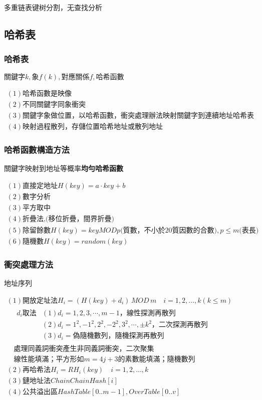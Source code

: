 \documentclass[UTF8]{ctexart}
\newcommand{\mt}[1]{\text{#1}}
\newcommand{\mb}[1]{\textbf{#1}}
\newcommand{\q}{\quad}
\newcommand{\ma}[1]{\begin{array}{llll} #1 \end{array}}
\begin{document}
多重链表键树分割，无查找分析

\subsection{哈希表}

\subsubsection{哈希表}


$\mt{關鍵字}k,\mt{象} f(k),\mt{對應關係}f,\mb{哈希函數}$

$\ma{
    (1) \mt{哈希函數是映像}\\
    (2) \mt{不同關鍵字同象}\mb{衝突}\\
    (3) \mt{關鍵字象做位置，以哈希函數，衝突處理辦法映射關鍵字到連續地址} \mb{哈希表}\\
    (4) \mt{映射過程}\mb{散列}，\mt{存儲位置}\mb{哈希地址或散列地址}
}$
 

\subsubsection{哈希函數構造方法}

關鍵字映射到地址等概率\mb{均勻哈希函數}

$\ma{
    (1) \mt{直接定地址} H(key)=a \cdot key +b\\
    (2) \mt{數字分析}\\
    (3) \mt{平方取中}\\
    (4) \mt{折疊法,(移位折疊，間界折疊)}\\
    (5) \mt{除留餘數}  H(key)=key MOD p\mt{(質數，不小於20質因數的合數)}, p \leqslant m\mt{(表長)}\\
    (6) \mt{隨機數}   H(key)=random(key)  
}$

\subsubsection{衝突處理方法}

地址序列

$\ma{
    (1) \mt{開放定址法} H_i=(H(key)+d_i) \, MOD\,  m \q i=1,2,\dots,k (k\leqslant m)\\
    \q \ma{
        d_i \mt{取法} &(1) d_i=1,2,3,\cdots,m-1  \mt{，線性探測再散列}\\
        &(2) d_i=1^2,-1^2,2^2,-2^2,3^2,\cdots,\pm k^2  \mt{，二次探測再散列}\\
        &(3) d_i=\mt{偽隨機數列，}\mt{隨機探測再散列}
    }\\
    \q \mt{處理同義詞衝突產生非同義詞衝突，}\mb{二次聚集}\\
    \q \mt{線性能填滿；平方形如}m=4j+3\mt{的素數能填滿；隨機數列}\\
    (2) \mt{再哈希法} H_i=RH_i(key) \q i=1,2,\dots,k\\
    (3) \mt{鏈地址法} Chain ChainHash[i]\\
    (4) \mt{公共溢出區} HashTable[0..m-1],OverTable[0..v]
}$
\end{document}
